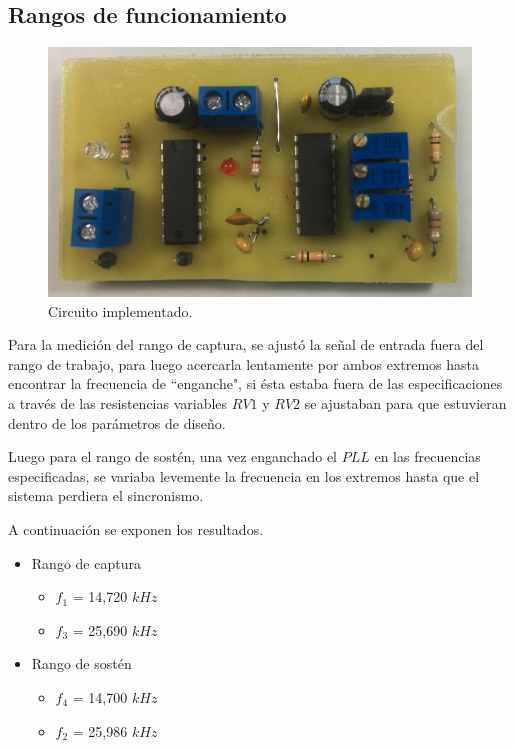 \documentclass[twocolumn]{article}
\begin{document}
\subsection{Rangos de funcionamiento}
\begin{figure}[H]
  \centering    
  \includegraphics[width=\columnwidth]{imagenes/fig6.jpg}
	\caption{Circuito implementado.}\label{fig:fig6}
\end{figure}

Para la medición del rango de captura, se ajustó la señal de entrada fuera del rango de trabajo, para luego acercarla lentamente por ambos extremos hasta encontrar la frecuencia de ``enganche", si ésta estaba fuera de las especificaciones a través de las resistencias variables $RV1$ y $RV2$ se ajustaban para que estuvieran dentro de los parámetros de diseño.

Luego para el rango de sostén, una vez enganchado el $PLL$ en las frecuencias especificadas, se variaba levemente la frecuencia en los extremos hasta que el sistema perdiera el sincronismo.

A continuación se exponen los resultados.
\begin{itemize}
	\item Rango de captura
		\begin{itemize}
			\item $f_1$ = 14,720 $kHz$
			\item $f_3$ = 25,690 $kHz$
		\end{itemize}
	\item Rango de sostén
		\begin{itemize}
		  \item $f_4$ = 14,700 $kHz$
		  \item $f_2$ = 25,986 $kHz$
		\end{itemize}
\end{itemize}
\end{document}
